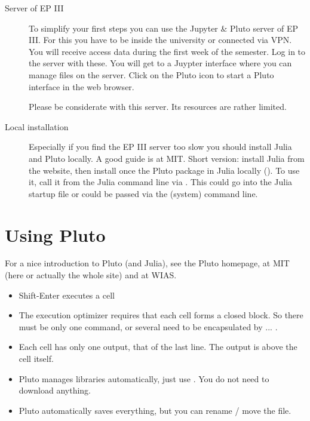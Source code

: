 \begin{description}
\item[Server of EP III] To simplify your first steps you can use the Jupyter \& Pluto server  of EP III. For this you have to be inside the university or connected via VPN. You will receive access data during the first week of the semester. Log in to the server with these. You will get to a Juypter interface where you can manage files on the server. Click on the Pluto icon to start a Pluto interface in the web browser.

Please be considerate with this server. Its resources are rather limited.

\item[Local installation] Especially if you find the EP III server too slow you should install Julia and Pluto locally. A good guide is at MIT. Short version: install Julia from the website, then install once the Pluto package in Julia locally (). To use it, call it from the Julia command line  via . This could go into the Julia startup file or could be passed via the (system) command line.



\end{description}


\section{Using Pluto}

For a nice introduction to Pluto (and Julia), see the Pluto homepage,
 at MIT 
(here
or actually the whole site)
and at WIAS.

\begin{itemize}
\item Shift-Enter executes a cell

\item The execution optimizer requires that each cell forms a closed block. So there must be only one command, or several need to be encapsulated by   ... .

\item Each cell has only one output, that of the last line. The output is above the cell itself.

\item Pluto manages libraries automatically, just use . You do not need to download anything.

\item Pluto automatically saves everything, but you can rename / move the file.



\end{itemize}





